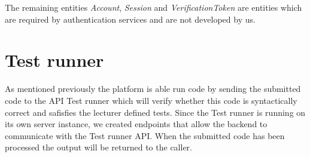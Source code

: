 The remaining entities \textit{Account}, \textit{Session} and \textit{VerificationToken} are entities which are required by authentication services and are not developed by us.

\section{Test runner}
As mentioned previously the platform is able run code by sending the submitted code to the API Test runner which will verify whether this code is syntactically correct and safisfies the lecturer defined tests.
Since the Test runner is running on its own server instance, we created endpoints that allow the backend to communicate with the Test runner API. When the submitted code has been processed the output will be returned to the caller.